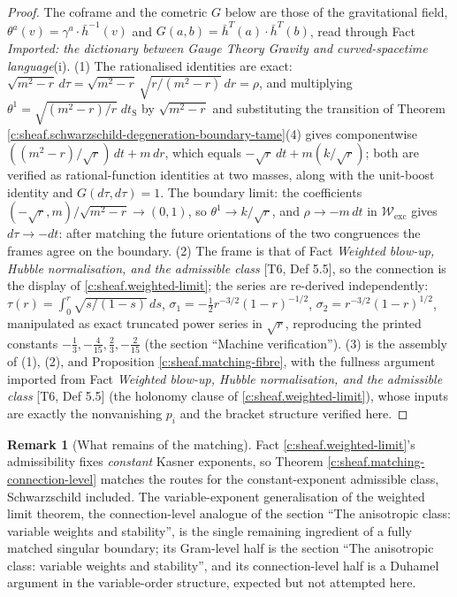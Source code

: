 \documentclass[11pt]{article}
\theoremstyle{definition}
\newtheorem{remark}[theorem]{Remark}
\theoremstyle{plain}
\providecommand{\dtPG}{}\renewcommand{\dtPG}{dt}
\providecommand{\dtS}{}\renewcommand{\dtS}{dt_{\mathrm{S}}}
\providecommand{\hb}{}\renewcommand{\hb}{\bar{h}}
\providecommand{\shW}{}\renewcommand{\shW}{\mathcal{W}}
\begin{document}
\begin{proof}
The coframe and the cometric $G$ below are those of the gravitational field, $\theta^a(v) = \gamma^a \cdot \hb^{-1}(v)$ and $G(a,b) = \hb^{T}(a) \cdot \hb^{T}(b)$, read through Fact \emph{Imported: the dictionary between Gauge Theory Gravity and curved-spacetime language}(i). (1) The rationalised identities are exact: $\sqrt{m^2-r}\,d\tau = \sqrt{m^2-r}\,\sqrt{r/(m^2-r)}\,dr = \rho$, and multiplying $\theta^1 = \sqrt{(m^2-r)/r}\;\dtS$ by $\sqrt{m^2-r}$ and substituting the transition of Theorem \ref{c:sheaf.schwarzschild-degeneration-boundary-tame}(4) gives componentwise $((m^2-r)/\sqrt r)\,\dtPG + m\,dr$, which equals $-\sqrt r\,\dtPG + m(k/\sqrt r)$; both are verified as rational-function identities at two masses, along with the unit-boost identity and $G(d\tau,d\tau) = 1$. The boundary limit: the coefficients $(-\sqrt r, m)/\sqrt{m^2-r} \to (0,1)$, so $\theta^1 \to k/\sqrt r$, and $\rho \to -m\,\dtPG$ in $\shW_{\mathrm{exc}}$ gives $d\tau \to -\dtPG$: after matching the future orientations of the two congruences the frames agree on the boundary. (2) The frame is that of Fact \emph{Weighted blow-up, Hubble normalisation, and the admissible class} [T6, Def 5.5], so the connection is the display of \ref{c:sheaf.weighted-limit}; the series are re-derived independently: $\tau(r) = \int_0^r \sqrt{s/(1-s)}\,ds$, $\sigma_1 = -\tfrac12 r^{-3/2}(1-r)^{-1/2}$, $\sigma_2 = r^{-3/2}(1-r)^{1/2}$, manipulated as exact truncated power series in $\sqrt r$, reproducing the printed constants $-\tfrac13, -\tfrac{4}{15}, \tfrac23, -\tfrac{2}{15}$ (the section ``Machine verification''). (3) is the assembly of (1), (2), and Proposition \ref{c:sheaf.matching-fibre}, with the fullness argument imported from Fact \emph{Weighted blow-up, Hubble normalisation, and the admissible class} [T6, Def 5.5] (the holonomy clause of \ref{c:sheaf.weighted-limit}), whose inputs are exactly the nonvanishing $p_i$ and the bracket structure verified here.

\end{proof}

\begin{remark}[What remains of the matching]\label{c:note.sheaf.what-remains-matching}
Fact \ref{c:sheaf.weighted-limit}'s admissibility fixes \emph{constant} Kasner exponents, so Theorem \ref{c:sheaf.matching-connection-level} matches the routes for the constant-exponent admissible class, Schwarzschild included. The variable-exponent generalisation of the weighted limit theorem, the connection-level analogue of the section ``The anisotropic class: variable weights and stability'', is the single remaining ingredient of a fully matched singular boundary; its Gram-level half is the section ``The anisotropic class: variable weights and stability'', and its connection-level half is a Duhamel argument in the variable-order structure, expected but not attempted here.
\end{remark}
\end{document}
